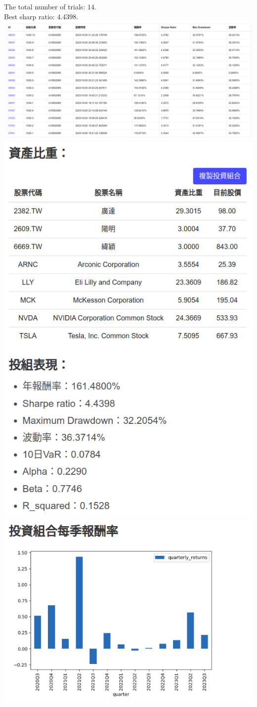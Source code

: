 \noindent
The total number of trials: $14$.\\
Best sharp ratio: $4.4398$.\\
\includegraphics[width=15cm]{id.png}\\
\includegraphics[width=15cm]{1.png}\\
\includegraphics[width=15cm]{2.png}
